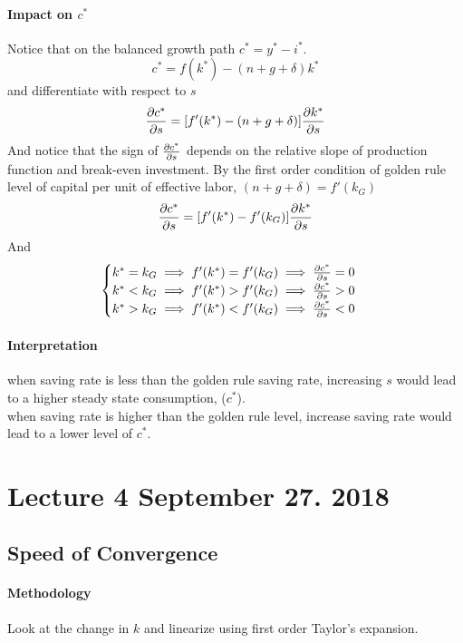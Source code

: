 \documentclass[11pt]{article}
\begin{document}
			\paragraph{Impact on $c^*$} Notice that on the balanced growth path $c^* = y^* - i^*$.
			\begin{equation}
				c^* = f(k^*) - (n+g+\delta)k^*
			\end{equation}
			and differentiate with respect to $s$
			\begin{equation}
				\frac{\partial{c^*}}{\partial{s}} = [f'(k^*) - (n+g+\delta)] \frac{\partial{k^*}}{\partial{s}}
			\end{equation}
			And notice that the sign of $\frac{\partial{c^*}}{\partial{s}}$ depends on the relative slope of production function and break-even investment.
			By the first order condition of golden rule level of capital per unit of effective labor, $(n+g+\delta) = f'(k_G)$
			\begin{gather}
				\frac{\partial{c^*}}{\partial{s}} = [f'(k^*) - f'(k_G)]\frac{\partial{k^*}}{\partial{s}}
			\end{gather}
			And 
			\begin{equation*}
				\begin{cases}
					k^* = k_G \implies f'(k^*) = f'(k_G) \implies \frac{\partial{c^*}}{\partial{s}} = 0 \\
					k^* < k_G \implies f'(k^*) > f'(k_G) \implies \frac{\partial{c^*}}{\partial{s}} > 0 \\
					k^* > k_G \implies f'(k^*) < f'(k_G) \implies \frac{\partial{c^*}}{\partial{s}} < 0
				\end{cases}
			\end{equation*}
		\paragraph{Interpretation} when saving rate is less than the golden rule saving rate, increasing $s$ would lead to a higher steady state consumption, ($c^*$). \\
		when saving rate is higher than the golden rule level, increase saving rate would lead to a lower level of $c^*$.
	\section{Lecture 4 September 27. 2018}
	\subsection{Speed of Convergence}
	    \paragraph{Methodology} Look at the change in $k$ and linearize using first order Taylor's expansion.
\end{document}
